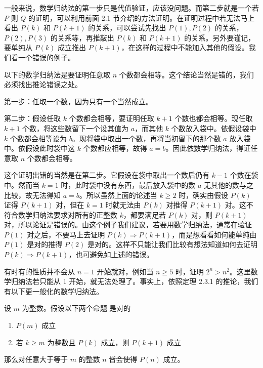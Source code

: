 一般来说，数学归纳法的第一步只是代值验证，应该没问题。而第二步就是一个若 $P$ 则 $Q$ 的证明，可以利用前面 2.1 节介绍的方法证明。在证明过程中若无法马上看出 $P(k)$ 和 $P(k + 1)$ 的关系，可以尝试先找出 $P(1), P(2)$ 的关系，$P(2), P(3)$ 的关系等，再推敲出 $P(k)$ 和 $P(k + 1)$ 的关系。另外要谨记，要单纯从 $P(k)$ 成立推出 $P(k + 1)$，在这样的过程中不能加入其他的假设。我们看一个错误的例子。

\begin{example}
以下的数学归纳法是要证明任意取 $n$ 个数都会相等。这个结论当然是错的，我们必须找出推论错误之处。

第一步：任取一个数，因为只有一个当然成立。

第二步：假设任取 $k$ 个数都会相等，要证明任取 $k + 1$ 个数也都会相等。现任取 $k + 1$ 个数，将这些数留下一个设其值为 $a$，而其他 $k$ 个数放入袋中。依假设袋中 $k$ 个数都会相等设为 $b$。现将袋中取出一个数，再将当初留下的那个数 $a$ 放入袋中。依假设此时袋中这 $k$ 个数都应相等，故得 $a = b$。因此依数学归纳法，得证任意取 $n$ 个数都会相等。
\end{example}

这个证明出错的当然是在第二步。它假设在袋中取出一个数后仍有 $k - 1$ 个数在袋中。然而当 $k = 1$ 时，此时袋中没有东西，最后放入袋中的数 $a$ 无其他的数与之比较，故无法得知 $a = b$。所以虽然上面的论述当 $k \ge 2$ 时，确实由假设 $P(k)$ 证得 $P(k + 1)$ 对，但在 $k = 1$ 时就无法由 $P(k)$ 对推得 $P(k + 1)$ 对。这不符合数学归纳法要求对所有的正整数 $k$，都要满足若 $P(k)$ 对，则 $P(k + 1)$ 对，所以论证是错误的。由这个例子我们建议，若要用数学归纳法，通常在验证 $P(1)$ 对之后，不要马上去证明 $P(k) \Rightarrow P(k + 1)$，而是想看看如何能单纯由 $P(1)$ 是对的推得 $P(2)$ 是对的。这样不只能让我们比较有想法知道如何去证明 $P(k) \Rightarrow P(k + 1)$，也可避免如上述的错误。

有时有的性质并不会从 $n = 1$ 开始就对，例如当 $n \ge 5$ 时，证明 $2^n > n^2$。这里数学归纳法若只能从 1 开始，就无法处理了。事实上，依照定理 2.3.1 的推论，我们有以下更一般化的数学归纳法。

\begin{corollary}
设 $m$ 为整数。假设以下两个命题 是对的
\begin{enumerate}
    \item[(EI1)] $P(m)$ 成立
    \item[(EI2)] 若 $k \ge m$ 为整数且 $P(k)$ 成立，则 $P(k+1)$ 成立
\end{enumerate}
那么对任意大于等于 $m$ 的整数 $n$ 皆会使得 $P(n)$ 成立。
\end{corollary}

